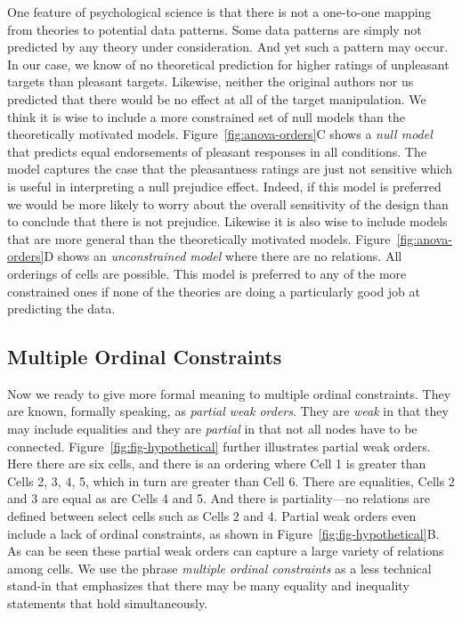 \documentclass[english,,man]{apa6}
\begin{document}
One feature of psychological science is that there is not a one-to-one mapping from theories to potential data patterns. Some data patterns are simply not predicted by any theory under consideration. And yet such a pattern may occur. In our case, we know of no theoretical prediction for higher ratings of unpleasant targets than pleasant targets.
Likewise, neither the original authors nor us predicted that there would be no effect at all of the target manipulation.
We think it is wise to include a more constrained set of null models than the theoretically motivated models.
Figure~\ref{fig:anova-orders}C shows a \emph{null model} that predicts equal endorsements of pleasant responses in all conditions. The model captures the case that the pleasantness ratings are just not sensitive which is useful in interpreting a null prejudice effect. Indeed, if this model is preferred we would be more likely to worry about the overall sensitivity of the design than to conclude that there is not prejudice.
Likewise it is also wise to include models that are more general than the theoretically motivated models. Figure~\ref{fig:anova-orders}D shows an \emph{unconstrained model} where there are no relations.
All orderings of cells are possible. This model is preferred to any of the more constrained ones if none of the theories are doing a particularly good job at predicting the data.

\hypertarget{multiple-ordinal-constraints}{%
\subsection{Multiple Ordinal Constraints}\label{multiple-ordinal-constraints}}

Now we ready to give more formal meaning to multiple ordinal constraints. They are known, formally speaking, as \emph{partial weak orders}. They are \emph{weak} in that they may include equalities and they are \emph{partial} in that not all nodes have to be connected. Figure~\ref{fig:fig-hypothetical} further illustrates partial weak orders. Here there are six cells, and there is an ordering where Cell 1 is greater than Cells 2, 3, 4, 5, which in turn are greater than Cell 6.
There are equalities, Cells 2 and 3 are equal as are Cells 4 and 5. And there is partiality---no relations are defined between select cells such as Cells 2 and 4. Partial weak orders even include a lack of ordinal constraints, as shown in Figure~\ref{fig:fig-hypothetical}B. As can be seen these partial weak orders can capture a large variety of relations among cells. We use the phrase \emph{multiple ordinal constraints} as a less technical stand-in that emphasizes that there may be many equality and inequality statements that hold simultaneously.
\end{document}
